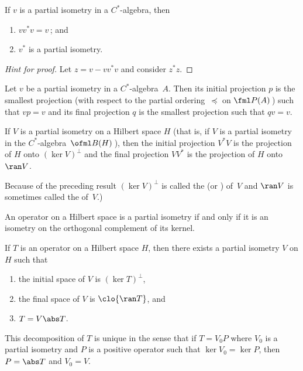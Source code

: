 \begin{prop}\label{pi0111} If $v$ is a partial isometry in a $C^*$-algebra, then
 \begin{enumerate}[label=\rm{(\alph*)}]
  \item $vv^*v = v$\,; and
  \item $v^*$ is a partial isometry.
 \end{enumerate}
\end{prop}

\begin{proof}[\emph{Hint for proof}] Let $z = v - vv^*v$ and consider $z^*z$.  \ns
\end{proof}

\begin{prop}\label{pi0114} Let $v$ be a partial isometry in a $C^*$-algebra~$A$.  Then its initial
projection $p$ is the smallest projection (with respect to the partial ordering~$\preceq$
on $\fml P(A)$\,) such that $vp = v$ and its final projection $q$ is the smallest
projection such that $qv = v$.
\end{prop}

\begin{prop}\label{pi0117} If $V$ is a partial isometry on a Hilbert space $H$ (that is, if $V$ is a partial
isometry in the $C^*$-algebra~$\ofml B(H)$\,), then the initial projection $V^*V$ is the
projection of $H$ onto $(\ker V)^\perp$ and the final projection $VV^*$ is the projection
of $H$ onto~$\ran V$.
\end{prop}

Because of the preceding result $(\ker V)^\perp$ is called the
 (or )  of~$V$ and $\ran V$ is sometimes called the
 of~$V$.)

\begin{prop}\label{pi0121} An operator on a Hilbert space is a partial isometry if and only if it is an
isometry on the orthogonal complement of its kernel.
\end{prop}





\begin{thm}\label{0022287} If $T$ is an operator on a Hilbert
space $H$, then there exists a partial isometry $V$ on $H$ such that
 \begin{enumerate}
    \item[(i)] the initial space of $V$ is $(\ker T)^\perp$,
    \item[(ii)] the final space of $V$ is $\clo{\ran T}$, and
    \item[(iii)] $T = V\abs T$.
 \end{enumerate}
This decomposition of $T$ is unique in the sense that if $T = V_0P$ where $V_0$ is a
partial isometry and $P$ is a positive operator such that $\ker V_0 = \ker P$, then $P =
\abs T$ and $V_0 = V$.
\end{thm}

